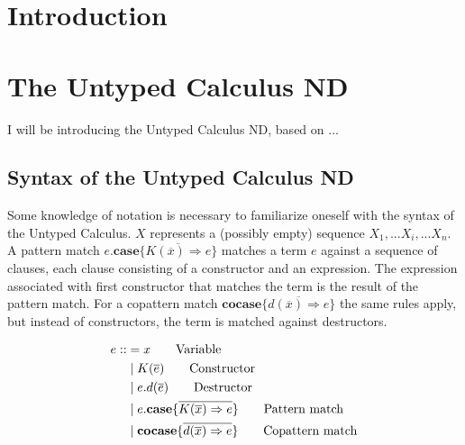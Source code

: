 \documentclass[twoside,12pt,a4paper]{article}
\begin{document}
\section{Introduction}


\section{The Untyped Calculus ND}

I will be introducing the Untyped Calculus ND, based on ... %

\subsection{Syntax of the Untyped Calculus ND}



Some knowledge of notation is necessary to familiarize oneself with the syntax of the Untyped Calculus.
$X$ represents a (possibly empty) sequence $X_1, ... X_i, ... X_n$.  
\\
A pattern match $e.\textbf{case}\{\overline{K(\overline{x})\Rightarrow e}\}$ 
matches a term $e$ against a sequence of clauses, each clause consisting of a constructor and an expression.
The expression associated with first constructor %
that matches the term is the result of the pattern match. %
For a copattern match $\textbf{cocase} \{\overline{d(\overline{x}) \Rightarrow e}\}$
the same rules apply, but instead of constructors, the term is matched against destructors.

\begin{definition}
\begin{align*}
    e  ::&=  x  \tag*{Variable} \\
        &\;|\;K(\overline{e}) \tag*{Constructor} \\
        &\;|\;e.d(\overline{e})  \tag*{Destructor}\\
        &\;|\;e.\textbf{case}\{\overline{K(\overline{x})\Rightarrow e}\}  \tag*{Pattern match}\\
        &\;|\;\textbf{cocase}\{\overline{d(\overline{x})\Rightarrow e}\}  \tag*{Copattern match}
\end{align*}
\end{definition}
\end{document}
